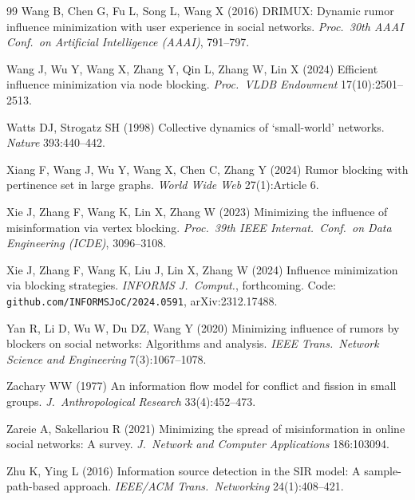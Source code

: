 \documentclass[ijoc,sglanonrev]{informs4}
\begin{document}
\begin{thebibliography}{99}
Wang B, Chen G, Fu L, Song L, Wang X (2016) DRIMUX: Dynamic rumor influence
  minimization with user experience in social networks. \emph{Proc.\ 30th
  AAAI Conf.\ on Artificial Intelligence (AAAI)}, 791--797.

Wang J, Wu Y, Wang X, Zhang Y, Qin L, Zhang W, Lin X (2024) Efficient
  influence minimization via node blocking. \emph{Proc.\ VLDB Endowment}
  17(10):2501--2513.

Watts DJ, Strogatz SH (1998) Collective dynamics of `small-world'
  networks. \emph{Nature} 393:440--442.

Xiang F, Wang J, Wu Y, Wang X, Chen C, Zhang Y (2024) Rumor blocking with
  pertinence set in large graphs. \emph{World Wide Web} 27(1):Article 6.

Xie J, Zhang F, Wang K, Lin X, Zhang W (2023) Minimizing the influence of
  misinformation via vertex blocking. \emph{Proc.\ 39th IEEE Internat.\
  Conf.\ on Data Engineering (ICDE)}, 3096--3108.

Xie J, Zhang F, Wang K, Liu J, Lin X, Zhang W (2024) Influence minimization
  via blocking strategies. \emph{INFORMS J.\ Comput.}, forthcoming. Code:
  \texttt{github.com/INFORMSJoC/2024.0591}, arXiv:2312.17488.

Yan R, Li D, Wu W, Du DZ, Wang Y (2020) Minimizing influence of rumors by
  blockers on social networks: Algorithms and analysis. \emph{IEEE Trans.\
  Network Science and Engineering} 7(3):1067--1078.

Zachary WW (1977) An information flow model for conflict and fission in
  small groups. \emph{J.\ Anthropological Research} 33(4):452--473.

\bibitem[{Zareie and Sakellariou(2021)}]{zareie2021}
Zareie A, Sakellariou R (2021) Minimizing the spread of misinformation in
  online social networks: A survey. \emph{J.\ Network and Computer
  Applications} 186:103094.

Zhu K, Ying L (2016) Information source detection in the SIR model: A
  sample-path-based approach. \emph{IEEE/ACM Trans.\ Networking}
  24(1):408--421.

\end{thebibliography}
\end{document}
